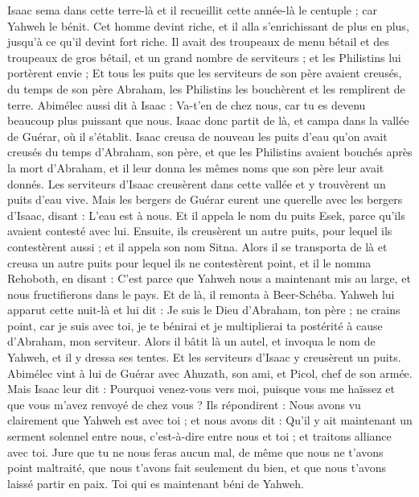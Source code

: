 \begin{multicols}{2}
Isaac sema dans cette terre-là et il recueillit cette année-là le centuple ; car Yahweh le bénit.
Cet homme devint riche, et il alla s'enrichissant de plus en plus, jusqu'à ce qu'il devint fort riche.
Il avait des troupeaux de menu bétail et des troupeaux de gros bétail, et un grand nombre de serviteurs ; et les Philistins lui portèrent envie ; 
Et tous les puits que les serviteurs de son père avaient creusés, du temps de son père Abraham, les Philistins les bouchèrent et les remplirent de terre.
Abimélec aussi dit à Isaac : Va-t'en de chez nous, car tu es devenu beaucoup plus puissant que nous.
Isaac donc partit de là, et campa dans la vallée de Guérar, où il s'établit.
Isaac creusa de nouveau les puits d'eau qu'on avait creusés du temps d'Abraham, son père, et que les Philistins avaient bouchés après la mort d'Abraham, et il leur donna les mêmes noms que son père leur avait donnés.
Les serviteurs d'Isaac creusèrent dans cette vallée et y trouvèrent un puits d'eau vive.
Mais les bergers de Guérar eurent une querelle avec les bergers d'Isaac, disant : L'eau est à nous. Et il appela le nom du puits Esek, parce qu'ils avaient contesté avec lui.
Ensuite, ils creusèrent un autre puits, pour lequel ils contestèrent aussi ; et il appela son nom Sitna.
Alors il se transporta de là et creusa un autre puits pour lequel ils ne contestèrent point, et il le nomma Rehoboth, en disant : C'est parce que Yahweh nous a maintenant mis au large, et nous fructifierons dans le pays.
Et de là, il remonta à Beer-Schéba.
Yahweh lui apparut cette nuit-là et lui dit : Je suis le Dieu d'Abraham, ton père ; ne crains point, car je suis avec toi, je te bénirai et je multiplierai ta postérité à cause d'Abraham, mon serviteur.
Alors il bâtit là un autel, et invoqua le nom de Yahweh, et il y dressa ses tentes. Et les serviteurs d'Isaac y creusèrent un puits.
Abimélec vint à lui de Guérar avec Ahuzath, son ami, et Picol, chef de son armée.
Mais Isaac leur dit : Pourquoi venez-vous vers moi, puisque vous me haïssez et que vous m'avez renvoyé de chez vous ?
Ils répondirent : Nous avons vu clairement que Yahweh est avec toi ; et nous avons dit : Qu'il y ait maintenant un serment solennel entre nous, c'est-à-dire entre nous et toi ; et traitons alliance avec toi.
Jure que tu ne nous feras aucun mal, de même que nous ne t'avons point maltraité, que nous t'avons fait seulement du bien, et que nous t'avons laissé partir en paix. Toi qui es maintenant béni de Yahweh.

\end{multicols}
